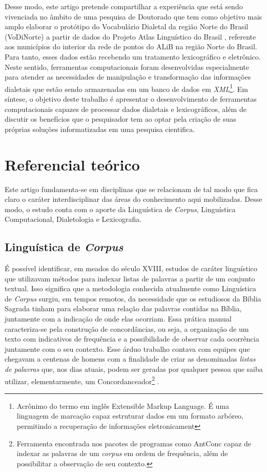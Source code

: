 \documentclass[portuguese]{textolivre}
\begin{document}
Desse modo, este artigo pretende compartilhar a experiência que está sendo vivenciada no âmbito de uma pesquisa de Doutorado que tem como objetivo mais amplo elaborar o protótipo do Vocabulário Dialetal da região Norte do Brasil (VoDiNorte) a partir de dados do Projeto Atlas Linguístico do Brasil \cite{comite2001}, referente aos municípios do interior da rede de pontos do ALiB na região Norte do Brasil. Para tanto, esses dados estão recebendo um tratamento lexicográfico e eletrônico. Neste sentido, ferramentas computacionais foram desenvolvidas especialmente para atender as necessidades de manipulação e transformação das informações dialetais que estão sendo armazenadas em um banco de dados em \emph{XML}\footnote{Acrônimo do termo em inglês Extensible Markup Language. É uma linguagem de marcação capaz estruturar dados em um formato arbóreo, permitindo a recuperação de informações eletronicament}. Em síntese, o objetivo deste trabalho é apresentar o desenvolvimento de ferramentas computacionais capazes de processar dados dialetais e lexicográficos, além de discutir os benefícios que o pesquisador tem ao optar pela criação de suas próprias soluções informatizadas em uma pesquisa cientifica.

\section{Referencial teórico}
Este artigo fundamenta-se em disciplinas que se relacionam de tal modo que fica claro o caráter interdisciplinar das áreas do conhecimento aqui mobilizadas. Desse modo, o estudo conta com o aporte da Linguística de \emph{Corpus}, Linguística Computacional, Dialetologia e Lexicografia.


\subsection{Linguística de \emph{Corpus}}
É possível identificar, em meados do século XVIII, estudos de caráter linguístico que utilizavam métodos para indexar listas de palavras a partir de um conjunto textual. Isso significa que a metodologia conhecida atualmente como Linguística de \textit{Corpus} surgiu, em tempos remotos, da necessidade que os estudiosos da Bíblia Sagrada tinham  para elaborar uma relação das palavras contidas na Bíblia, juntamente com a indicação de onde elas ocorriam. Essa prática manual caracteriza-se pela construção de concordâncias, ou seja, a organização de um texto com indicativos de frequência e a possibilidade de observar cada ocorrência juntamente com o seu contexto. Esse árduo trabalho contava com equipes que chegavam a centenas de homens com a finalidade de criar as denominadas \emph{listas de palavras} que, nos dias atuais, podem ser geradas por qualquer pessoa que saiba utilizar, elementarmente, um Concordanceador\footnote{Ferramenta encontrada nos pacotes de programas como AntConc capaz de indexar as palavras de um \textit{corpus} em ordem de frequência, além de possibilitar a observação de seu contexto.} \cite[p. 3]{okeefe2010routledge}.
\end{document}
